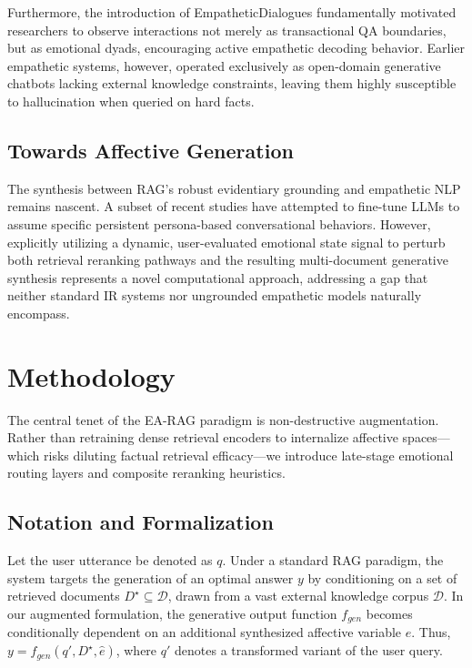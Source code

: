 \documentclass[conference]{IEEEtran}
\begin{document}
Furthermore, the introduction of EmpatheticDialogues \cite{3} fundamentally motivated researchers to observe interactions not merely as transactional QA boundaries, but as emotional dyads, encouraging active empathetic decoding behavior. Earlier empathetic systems, however, operated exclusively as open-domain generative chatbots lacking external knowledge constraints, leaving them highly susceptible to hallucination when queried on hard facts.

\subsection{Towards Affective Generation}
The synthesis between RAG's robust evidentiary grounding and empathetic NLP remains nascent. A subset of recent studies have attempted to fine-tune LLMs to assume specific persistent persona-based conversational behaviors. However, explicitly utilizing a dynamic, user-evaluated emotional state signal to perturb both retrieval reranking pathways and the resulting multi-document generative synthesis represents a novel computational approach, addressing a gap that neither standard IR systems nor ungrounded empathetic models naturally encompass.


\section{Methodology}

The central tenet of the EA-RAG paradigm is non-destructive augmentation. Rather than retraining dense retrieval encoders to internalize affective spaces---which risks diluting factual retrieval efficacy---we introduce late-stage emotional routing layers and composite reranking heuristics.

\subsection{Notation and Formalization}
Let the user utterance be denoted as $q$. Under a standard RAG paradigm, the system targets the generation of an optimal answer $y$ by conditioning on a set of retrieved documents $D^\star \subseteq \mathcal{D}$, drawn from a vast external knowledge corpus $\mathcal{D}$. 
In our augmented formulation, the generative output function $f_{gen}$ becomes conditionally dependent on an additional synthesized affective variable $\hat{e}$. Thus, $y = f_{gen}(q', D^\star, \hat{e})$, where $q'$ denotes a transformed variant of the user query.
\end{document}
